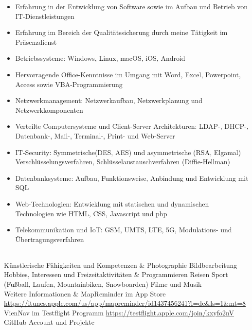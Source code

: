 \begin{longtabu}
\begin{itemize}[nosep,leftmargin=1em]
	\item Erfahrung in der Entwicklung von Software sowie im Aufbau und Betrieb von IT-Dienstleistungen
	\item Erfahrung im Bereich der Qualitätssicherung durch meine Tätigkeit im Präsenzdienst
	\item Betriebssysteme: Windows, Linux, macOS, iOS, Android
	\item Hervorragende Office-Kenntnisse im Umgang mit Word, Excel, Powerpoint, Access sowie VBA-Programmierung
	\item Netzwerkmanagement: Netzwerkaufbau, Netzwerkplanung und Netzwerkkomponenten
	\item Verteilte Computersysteme und Client-Server Architekturen: LDAP-, DHCP-, Datenbank-, Mail-, Terminal-, Print- und Web-Server
	\item IT-Security: Symmetrische(DES, AES) und asymmetrische (RSA, Elgamal) Verschlüsselungsverfahren, Schlüsselaustauschverfahren (Diffie-Hellman)
	\item Datenbanksysteme: Aufbau, Funktionsweise, Anbindung und Entwicklung mit SQL
	\item Web-Technologien: Entwicklung mit statischen und dynamischen Technologien wie HTML, CSS, Javascript und php
	\item Telekommunikation und IoT: GSM, UMTS, LTE, 5G, Modulations- und Übertragungsverfahren %
	\end{itemize} \\
	Künstlerische Fähigkeiten und Kompetenzen &
	\tabitem Photographie \newline
	\tabitem Bildbearbeitung \\ \bottomrule
	Hobbies, Interessen und Freizeitaktivitäten &
	\tabitem Programmieren \newline
	\tabitem Reisen \newline
	\tabitem Sport (Fußball, Laufen, Mountainbiken, Snowboarden) \newline
	\tabitem Filme und Musik \\ \bottomrule
	Weitere Informationen &
	MapReminder im App Store \newline
	\small{\url{https://itunes.apple.com/us/app/mapreminder/id1437456241?l=de&ls=1&mt=8}} \newline
	VienNav im Testflight Programm \newline
	\small{\url{https://testflight.apple.com/join/kxyfo2nV}} \newline
	GitHub Account und Projekte \newline

\end{longtabu}
